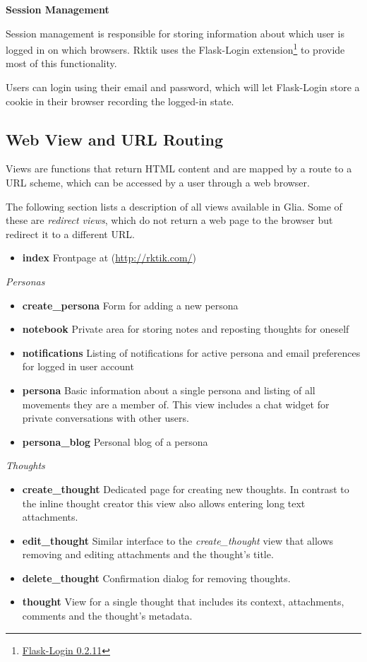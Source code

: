 \textbf{Session Management}

Session management is responsible for storing information about which
user is logged in on which browsers. Rktik uses the Flask-Login
extension\footnote{\href{https://pypi.python.org/pypi/Flask-Login/0.2.11}{Flask-Login
  0.2.11}} to provide most of this functionality.

Users can login using their email and password, which will let
Flask-Login store a cookie in their browser recording the logged-in
state.

\subsection{Web View and URL Routing}\label{web-view-and-url-routing}

Views are functions that return HTML content and are mapped by a route
to a URL scheme, which can be accessed by a user through a web browser.

The following section lists a description of all views available in
Glia. Some of these are \emph{redirect views}, which do not return a web
page to the browser but redirect it to a different URL.

\begin{itemize}
\tightlist
\item
  \textbf{index} Frontpage at (\url{http://rktik.com/})
\end{itemize}

\emph{Personas}

\begin{itemize}
\tightlist
\item
  \textbf{create\_persona} Form for adding a new persona
\item
  \textbf{notebook} Private area for storing notes and reposting
  thoughts for oneself
\item
  \textbf{notifications} Listing of notifications for active persona and
  email preferences for logged in user account
\item
  \textbf{persona} Basic information about a single persona and listing
  of all movements they are a member of. This view includes a chat
  widget for private conversations with other users.
\item
  \textbf{persona\_blog} Personal blog of a persona
\end{itemize}

\emph{Thoughts}

\begin{itemize}
\tightlist
\item
  \textbf{create\_thought} Dedicated page for creating new thoughts. In
  contrast to the inline thought creator this view also allows entering
  long text attachments.
\item
  \textbf{edit\_thought} Similar interface to the \emph{create\_thought}
  view that allows removing and editing attachments and the thought's
  title.
\item
  \textbf{delete\_thought} Confirmation dialog for removing thoughts.
\item
  \textbf{thought} View for a single thought that includes its context,
  attachments, comments and the thought's metadata.
\end{itemize}

